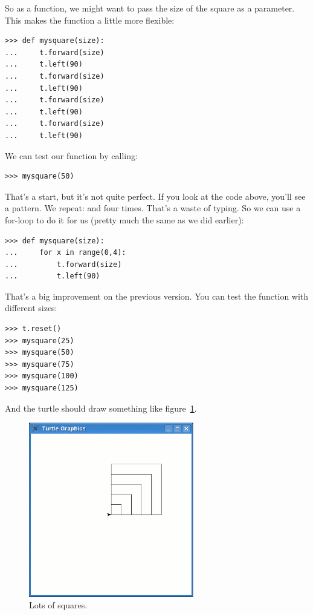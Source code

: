 So as a function, we might want to pass the size of the square as a parameter.  This makes the function a little more flexible:

\begin{listing}
\begin{verbatim}
>>> def mysquare(size):
...     t.forward(size)
...     t.left(90)
...     t.forward(size)
...     t.left(90)
...     t.forward(size)
...     t.left(90)
...     t.forward(size)
...     t.left(90)
\end{verbatim}
\end{listing}

\noindent
We can test our function by calling:

\begin{listing}
\begin{verbatim}
>>> mysquare(50)
\end{verbatim}
\end{listing}

That's a start, but it's not quite perfect.  If you look at the code above, you'll see a pattern.  We repeat:  and  four times.  That's a waste of typing.  So we can use a for-loop to do it for us (pretty much the same as we did earlier):

\begin{listing}
\begin{verbatim}
>>> def mysquare(size):
...     for x in range(0,4):
...         t.forward(size)
...         t.left(90)
\end{verbatim}
\end{listing}

That's a big improvement on the previous version. You can test the function with different sizes:

\begin{listing}
\begin{verbatim}
>>> t.reset()
>>> mysquare(25)
>>> mysquare(50)
>>> mysquare(75)
>>> mysquare(100)
>>> mysquare(125)
\end{verbatim}
\end{listing}

And the turtle should draw something like figure~\ref{fig26}.

\begin{figure}
\begin{center}
\includegraphics[width=72mm]{eps/figure26.eps}
\end{center}
\caption{Lots of squares.}\label{fig26}
\end{figure}

